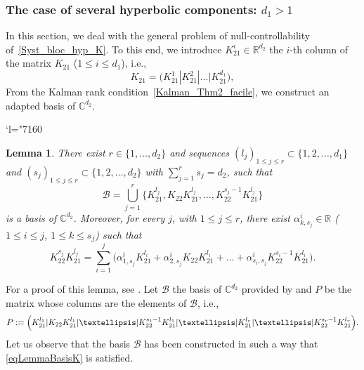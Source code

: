 \documentclass[11pt]{article}
\providecommand{\C}{}
\newcommand{\ie}{i.e.,\xspace}
\let\mathcal\mathscr
\newcommand{\Changel}{\mathcode`l="7160}
\theoremstyle{plain}
\newtheorem{lemma}[theorem]{Lemma}
\theoremstyle{definition}
\theoremstyle{remark}
\newcommand{\set}{\mathbb}
\newcommand{\R}{} %
\renewcommand{\R}{\set{R}}
\renewcommand{\C}{\set{C}}
\newcommand{\coloneqq}{\mathrel{\mathord{:}\mathord=}}
\begin{document}
\subsubsection{The case of several hyperbolic components: $d_1 >1$}
\label{SectionKd1>1}

In this section, we deal with the general problem of null-controllability of~\eqref{Syst_bloc_hyp_K}. To this end, we introduce $K_{21}^i \in \R^{d_2}$ the $i$-th column of the matrix $K_{21}$ ($1 \leq i \leq d_1$), \ie
\[
K_{21} = \bigl(K_{21}^1 | K_{21}^2 | \dots | K_{21}^{d_1} \bigr),
\]
From the Kalman rank condition~\eqref{Kalman_Thm2_facile}, we construct an adapted basis of $\C^{d_2}$.

\Changel

\begin{lemma}
\label{AdaptedBasisLemma}
There exist $r \in \{1, \dots, d_2\}$ and sequences $(l_j)_{1 \leq j \leq r} \subset \{1, 2, \dots, d_1\}$ and $(s_j)_{1 \leq j \leq r} \subset \{1, 2, \dots, d_2\}$ with $\sum_{j=1}^r s_j =d_2$, such that
\[
\mathcal{B} = \bigcup\limits_{j=1}^{r} \bigl\{K_{21}^{l_j}, K_{22} K_{21}^{l_j}, \dots, K_{22}^{s_j-1} K_{21}^{l_j} \bigr\}
\]
is a basis of $\C^{d_2}$. Moreover, for every $j$, with $1 \leq j \leq r$, there exist $\alpha_{k,s_j}^i \in \R$ ($1 \leq i \leq j$, $1 \leq k \leq s_j$) such that
\begin{equation}
K_{22}^{s_j} K_{21}^{l_j} = \sum_{i=1}^j \bigl(\alpha_{1, s_j}^i K_{21}^{l_i} + \alpha_{2, s_j}^i K_{22} K_{21}^{l_i} + \dots + \alpha_{s_i,s_j}^i K_{22}^{s_i-1} K_{21}^{l_i}\bigr).
\label{eqLemmaBasisK}
\end{equation}
\end{lemma}

For a proof of this lemma, see \cite[Lem.\,3.1]{ammarkhodja_2009a}. Let $\mathcal{B}$ the basis of $\C^{d_2}$ provided by  and $P$ be the matrix whose columns are the elements of $\mathcal{B}$, \ie
\[
P \coloneqq \Bigl(K_{21}^{l_1} | K_{22} K_{21}^{l_1} | \dots | K_{22}^{s_1-1} K_{21}^{l_1}| \dots | K_{21}^{l_r} | \dots | K_{22}^{s_r-1} K_{21}^{l_r} \Bigr).
\]
Let us observe that the basis $\mathcal{B}$ has been constructed in such a way that \eqref{eqLemmaBasisK} is satisfied.
\end{document}
